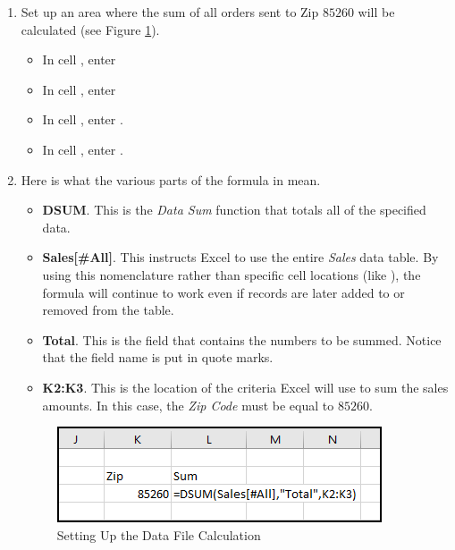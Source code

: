 \begin{enumerate}[resume]
	\item Set up an area where the sum of all orders sent to Zip $ 85260 $ will be calculated (see Figure \ref{09:fig21}).

	\begin{itemize}
		\item In cell , enter 
		\item In cell , enter 
		\item In cell , enter  . 
		\item In cell , enter . 
	\end{itemize}

	\item Here is what the various parts of the formula in  mean.		

	\begin{itemize}
		\item \textbf{DSUM}. This is the \textit{Data Sum} function that totals all of the specified data.
		\item \textbf{Sales[\#All]}. This instructs Excel to use the entire \textit{Sales} data table. By using this nomenclature rather than specific cell locations (like ), the formula will continue to work even if records are later added to or removed from the table.
		\item \textbf{Total}. This is the field that contains the numbers to be summed. Notice that the field name is put in quote marks.
		\item \textbf{K2:K3}. This is the location of the criteria Excel will use to sum the sales amounts. In this case, the \textit{Zip Code} must be equal to $ 85260 $.
	\end{itemize}	

	\begin{figure}[H]
		\centering
		\includegraphics[width=\maxwidth{.75\linewidth}]{gfx/ch09_fig21}
		\caption{Setting Up the Data File Calculation}
		\label{09:fig21}
	\end{figure}


\end{enumerate}
